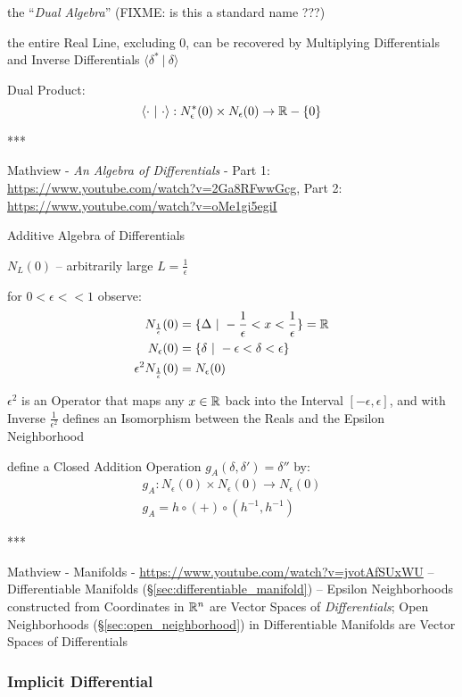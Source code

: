 the ``\emph{Dual Algebra}''
(FIXME: is this a standard name ???)

the entire Real Line, excluding $0$, can be recovered by Multiplying
Differentials and Inverse Differentials $\langle \delta^* \ |\ \delta \rangle$

Dual Product:
\[
  \langle \cdot \ |\ \cdot\rangle :
    N_\epsilon^*(0) \times N_\epsilon(0) \rightarrow \reals - \{0\}
\]

***

Mathview - \emph{An Algebra of Differentials} -
Part 1: \url{https://www.youtube.com/watch?v=2Ga8RFwwGcg}, Part 2:
\url{https://www.youtube.com/watch?v=oMe1gi5egiI}

Additive Algebra of Differentials

$N_L(0)$ -- arbitrarily large $L = \frac{1}{\epsilon}$

for $0 < \epsilon << 1$ observe:
\begin{align*}
  N_{\frac{1}{\epsilon}}(0) & =
    \{ \Delta \ |\ -\frac{1}{\epsilon} < x < \frac{1}{\epsilon} \} = \mathbb{R} \\
  N_\epsilon(0) & = \{ \delta \ |\ -\epsilon < \delta < \epsilon \} \\
  \epsilon^2 N_{\frac{1}{\epsilon}}(0) & = N_\epsilon(0)
\end{align*}

$\epsilon^2$ is an Operator that maps any $x \in \mathbb{R}$ back into the Interval
$[-\epsilon, \epsilon]$, and with Inverse $\frac{1}{\epsilon^2}$ defines an
Isomorphism between the Reals and the Epsilon Neighborhood

define a Closed Addition Operation $g_A(\delta, \delta') = \delta''$ by:
\begin{align*}
  g_A : N_\epsilon(0) \times N_\epsilon(0) \rightarrow N_\epsilon(0) \\
  g_A = h \circ (+) \circ (h^{-1}, h^{-1})
\end{align*}

***

Mathview - Manifolds - \url{https://www.youtube.com/watch?v=jvotAfSUxWU}
--
Differentiable Manifolds (\S\ref{sec:differentiable_manifold}) -- Epsilon
Neighborhoods constructed from Coordinates in $\mathbb{R}^n$ are Vector Spaces of
\emph{Differentials}; Open Neighborhoods (\S\ref{sec:open_neighborhood}) in
Differentiable Manifolds are Vector Spaces of Differentials



\subsubsection{Implicit Differential}\label{sec:implicit_differential}

